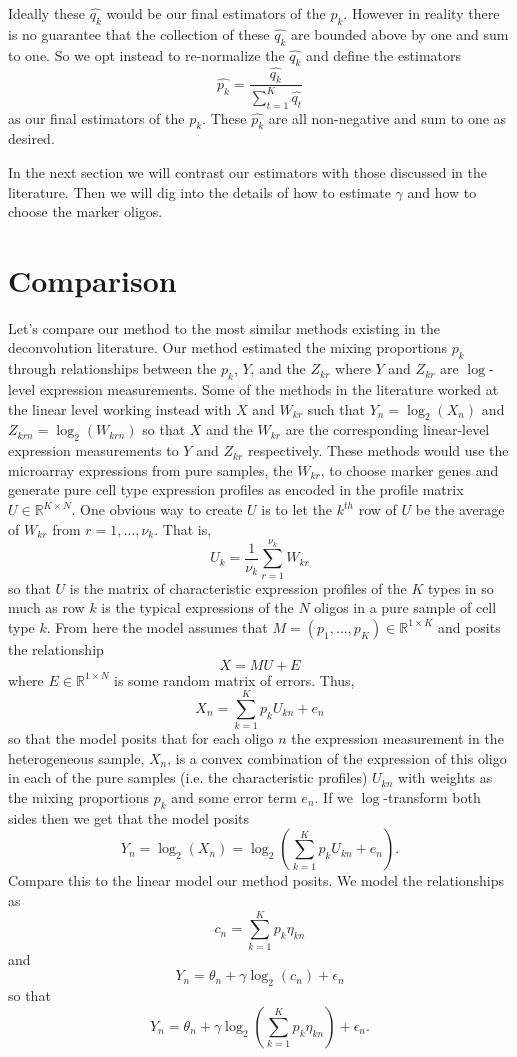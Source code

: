 \documentclass[reqno,12pt,oneside]{report}\usepackage[]{graphicx}\usepackage[]{color}
\theoremstyle{plain}
\theoremstyle{definition}
\theoremstyle{remark}
\numberwithin{theorem}{chapter}     %
\begin{document}
Ideally these $\widehat{q_k}$ would be our final estimators of the $p_k$. However in reality there is no guarantee that the collection of these $\widehat{q_k}$ are bounded above by one and sum to one. So we opt instead to re-normalize the $\widehat{q_k}$ and define the estimators
\[
\widehat{p_k} = \frac{\widehat{q_k}}{\sum_{t=1}^{K}\widehat{q_t}}
\]
as our final estimators of the $p_k$. These $\widehat{p_k}$ are all non-negative and sum to one as desired. 

In the next section we will contrast our estimators with those discussed in the literature. Then we will dig into the details of how to estimate $\gamma$ and how to choose the marker oligos.

\section{Comparison}

Let's compare our method to the most similar methods existing in the deconvolution literature. Our method estimated the mixing proportions $p_k$ through relationships between the $p_k$, $Y$, and the $Z_{kr}$ where $Y$ and $Z_{kr}$ are $\log$-level expression measurements. Some of the methods in the literature worked at the linear level working instead with $X$ and $W_{kr}$ such that $Y_n = \log_2(X_n)$ and $Z_{krn}=\log_2(W_{krn})$ so that $X$ and the $W_{kr}$ are the corresponding linear-level expression measurements to $Y$ and $Z_{kr}$ respectively. These methods would use the microarray expressions from pure samples, the $W_{kr}$, to choose marker genes and generate pure cell type expression profiles as encoded in the profile matrix $U\in\mathbb{R}^{K\times N}$. One obvious way to create $U$ is to let the $k^{th}$ row of $U$ be the average of $W_{kr}$ from $r=1,\ldots,\nu_k$. That is,
\[
U_k = \frac{1}{\nu_k} \sum_{r=1}^{\nu_k}W_{kr}
\]
so that $U$ is the matrix of characteristic expression profiles of the $K$ types in so much as row $k$ is the typical expressions of the $N$ oligos in a pure sample of cell type $k$. 
From here the model assumes that $M=(p_1,\ldots,p_K) \in \mathbb{R}^{1\times K}$ and posits the relationship
\[
X = MU + E
\]
where $E\in\mathbb{R}^{1\times N}$ is some random matrix of errors. Thus, 
\[
X_n = \sum_{k=1}^{K}p_kU_{kn}+e_{n}
\]
so that the model posits that for each oligo $n$ the expression measurement in the heterogeneous sample, $X_n$, is a convex combination of the expression of this oligo in each of the pure samples (i.e. the characteristic profiles) $U_{kn}$ with weights as the mixing proportions $p_k$ and some error term $e_n$. If we $\log$-transform both sides then we get that the model posits
\begin{equation}
\label{eqn:complit}
Y_n = \log_2\left(X_n\right) = \log_2\left(\sum_{k=1}^{K}p_kU_{kn}+e_{n}\right).
\end{equation}
Compare this to the linear model our method posits. We model the relationships as 
\[
c_n = \sum_{k=1}^{K}p_k\eta_{kn}
\]
and 
\[
Y_n = \theta_n + \gamma\log_2\left(c_n\right)+\epsilon_n
\]
so that
\begin{equation}
\label{eqn:compours}
Y_n = \theta_n + \gamma\log_2\left(\sum_{k=1}^{K}p_k\eta_{kn}\right)+\epsilon_n.
\end{equation}
\end{document}
